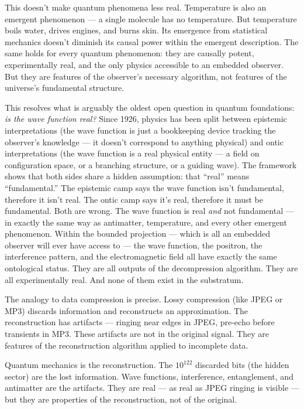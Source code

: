 \documentclass[
]{article}
\begin{document}
This doesn't make quantum phenomena less real. Temperature is also an
emergent phenomenon --- a single molecule has no temperature. But
temperature boils water, drives engines, and burns skin. Its emergence
from statistical mechanics doesn't diminish its causal power within the
emergent description. The same holds for every quantum phenomenon: they
are causally potent, experimentally real, and the only physics
accessible to an embedded observer. But they are features of the
observer's necessary algorithm, not features of the universe's
fundamental structure.

This resolves what is arguably the oldest open question in quantum
foundations: \emph{is the wave function real?} Since 1926, physics has
been split between epistemic interpretations (the wave function is just
a bookkeeping device tracking the observer's knowledge --- it doesn't
correspond to anything physical) and ontic interpretations (the wave
function is a real physical entity --- a field on configuration space,
or a branching structure, or a guiding wave). The framework shows that
both sides share a hidden assumption: that ``real'' means
``fundamental.'' The epistemic camp says the wave function isn't
fundamental, therefore it isn't real. The ontic camp says it's real,
therefore it must be fundamental. Both are wrong. The wave function is
real \emph{and} not fundamental --- in exactly the same way as
antimatter, temperature, and every other emergent phenomenon. Within the
bounded projection --- which is all an embedded observer will ever have
access to --- the wave function, the positron, the interference pattern,
and the electromagnetic field all have exactly the same ontological
status. They are all outputs of the decompression algorithm. They are
all experimentally real. And none of them exist in the substratum.

The analogy to data compression is precise. Lossy compression (like JPEG
or MP3) discards information and reconstructs an approximation. The
reconstruction has artifacts --- ringing near edges in JPEG, pre-echo
before transients in MP3. These artifacts are not in the original
signal. They are features of the reconstruction algorithm applied to
incomplete data.

Quantum mechanics is the reconstruction. The \(10^{122}\) discarded bits
(the hidden sector) are the lost information. Wave functions,
interference, entanglement, and antimatter are the artifacts. They are
real --- as real as JPEG ringing is visible --- but they are properties
of the reconstruction, not of the original.
\end{document}
